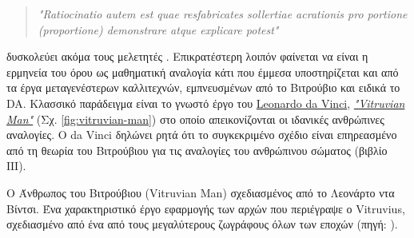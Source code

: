\begin{description}[style=nextline]
\begin{quote}
\itshape
"Ratiocinatio autem est quae resfabricates sollertiae acrationis pro portione (proportione) demonstrare atque explicare potest"
\end{quote}

δυσκολεύει ακόμα τους μελετητές \cite{graham-education}. Επικρατέστερη λοιπόν φαίνεται να είναι η ερμηνεία του όρου ως μαθηματική αναλογία κάτι που έμμεσα υποστηρίζεται και από τα έργα μεταγενέστερων καλλιτεχνών, εμπνευσμένων από το  Βιτρούβιο και ειδικά το DA. Κλασσικό παράδειγμα είναι το γνωστό έργο του \href{https://en.wikipedia.org/wiki/Leonardo_da_Vinci}{Leonardo da Vinci}, \href{https://en.wikipedia.org/wiki/Vitruvian_Man}{\emph{"Vitruvian Man"}} (Σχ. \ref{fig:vitruvian-man}) στο οποίο απεικονίζονται οι ιδανικές ανθρώπινες αναλογίες. Ο da Vinci δηλώνει ρητά ότι το συγκεκριμένο σχέδιο είναι επηρεασμένο από τη θεωρία του Βιτρούβιου για τις αναλογίες του ανθρώπινου σώματος (βιβλίο ΙΙΙ).
\end{description}


\begin{marginfigure}%
  \caption{\footnotesize Ο  Άνθρωπος του Βιτρούβιου (Vitruvian Man) σχεδιασμένος
  από το Λεονάρτο ντα Βίντσι. Ένα χαρακτηριστικό έργο εφαρμογής των αρχών που περιέγραψε ο Vitruvius, σχεδιασμένο από ένα από τους μεγαλύτερους ζωγράφους όλων των εποχών
  (πηγή: \cite{wikipedia:vitruvianman}).}
  \label{fig:vitruvian-man}
\end{marginfigure}










